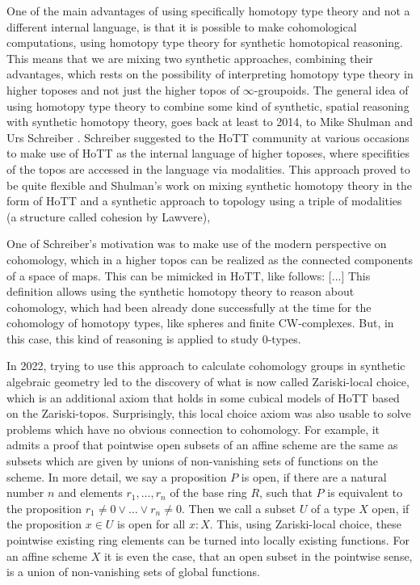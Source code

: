 \documentclass{../util/zariski}
\begin{document}
One of the main advantages of using specifically homotopy type theory and not a different internal language,
is that it is possible to make cohomological computations, using homotopy type theory for synthetic homotopical reasoning.
This means that we are mixing two synthetic approaches, combining their advantages,
which rests on the possibility of interpreting homotopy type theory in higher toposes \cite{shulman2019all} and not just the higher topos of $\infty$-groupoids.
The general idea of using homotopy type theory to combine some kind of synthetic, spatial reasoning with synthetic homotopy theory, goes back at least to 2014, to Mike Shulman and Urs Schreiber \cite{Schreiber_2014}.
Schreiber suggested to the HoTT community at various occasions to make use of HoTT as the internal language of higher toposes, where specifities of the topos are accessed in the language via modalities.
This approach proved to be quite flexible and Shulman's \cite{shulman-Brouwer-fixed-point} work on mixing synthetic homotopy theory in the form of HoTT and a synthetic approach to topology using a triple of modalities (a structure called cohesion by Lawvere),

One of Schreiber's motivation was to make use of the modern perspective on cohomology, which in a higher topos can be realized as the connected components of a space of maps. This can be mimicked in HoTT, like follows: [...]
This definition allows using the synthetic homotopy theory to reason about cohomology, which had been already done successfully at the time for the cohomology of homotopy types, like spheres and finite CW-complexes. But, in this case, this kind of reasoning is applied to study $0$-types.

In 2022, trying to use this approach to calculate cohomology groups in synthetic algebraic geometry led to the discovery of what is now called Zariski-local choice, which is an additional axiom that holds in some cubical models of HoTT based on the Zariski-topos. Surprisingly, this local choice axiom was also usable to solve problems which have no obvious connection to cohomology. For example, it admits a proof that pointwise open subsets of an affine scheme are the same as subsets which are given by unions of non-vanishing sets of functions on the scheme.
In more detail, we say a proposition $P$ is open, if there are a natural number $n$ and elements $r_1,\dots,r_n$ of the base ring $R$,
such that $P$ is equivalent to the proposition $r_1\neq 0 \vee\dots\vee r_n\neq 0$.
Then we call a subset $U$ of a type $X$ open, if the proposition $x\in U$ is open for all $x:X$.
This, using Zariski-local choice, these pointwise existing ring elements can be turned into locally existing functions.
For an affine scheme $X$ it is even the case, that an open subset in the pointwise sense, is a union of non-vanishing sets of global functions.
\end{document}
